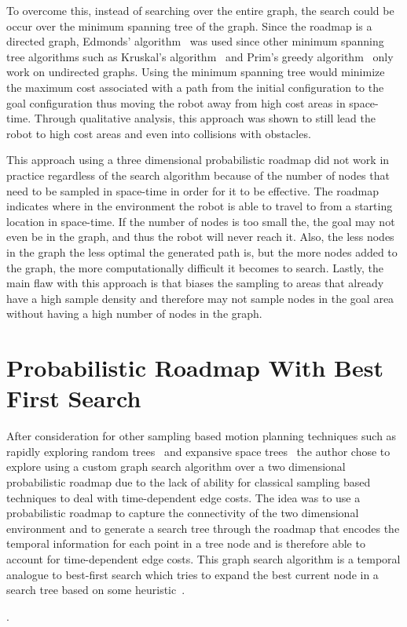 To overcome this, instead of searching over the entire graph, the search could
be occur over the minimum spanning tree of the graph.  Since the roadmap is a
directed graph, Edmonds' algorithm~\cite{edmonds} was used since other minimum
spanning tree algorithms such as Kruskal's algorithm~\cite{kruskal} and Prim's
greedy algorithm~\cite{prim} only work on undirected graphs. Using the minimum
spanning tree would minimize the maximum cost associated with a path from the
initial configuration to the goal configuration thus moving the robot away from
high cost areas in space-time. Through qualitative analysis, this approach was
shown to still lead the robot to high cost areas and even into collisions with
obstacles.

This approach using a three dimensional probabilistic roadmap did not work in
practice regardless of the search algorithm because of the number of nodes that
need to be sampled in space-time in order for it to be effective.  The roadmap
indicates where in the environment the robot is able to travel to from a
starting location in space-time. If the number of nodes is too small the, the
goal may not even be in the graph, and thus the robot will never reach it.
Also, the less nodes in the graph the less optimal the generated path is, but
the more nodes added to the graph, the more computationally difficult it
becomes to search. Lastly, the main flaw with this approach is that biases the
sampling to areas that already have a high sample density and therefore may not
sample nodes in the goal area without having a high number of nodes in the
graph.

\section{Probabilistic Roadmap With Best First Search}

After consideration for other sampling based motion planning techniques such as
rapidly exploring random trees~\cite{rrt} and expansive space trees~\cite{est}
the author chose to explore using a custom graph search algorithm over a two
dimensional probabilistic roadmap due to the lack of ability for classical
sampling based techniques to deal with time-dependent edge costs. The idea was
to use a probabilistic roadmap to capture the connectivity of the two
dimensional environment and to generate a search tree through the roadmap that
encodes the temporal information for each point in a tree node and is therefore
able to account for time-dependent edge costs. This graph search algorithm is a
temporal analogue to best-first search which tries to expand the best current
node in a search tree based on some heuristic~\cite{bestfs}.

\label{sec:dodgermethod}.


